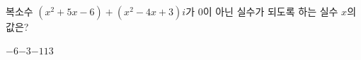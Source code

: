 복소수 $(x^2+5x-6)+(x^2-4x+3)i$가 0이 아닌 실수가 되도록 하는 실수 $x$의 값은?
\begin{choices32}{$-6$}{$-3$}{$-1$}{$1$}{$3$}\end{choices32}
